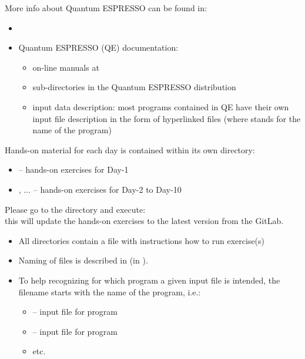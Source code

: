\documentclass[landscape]{foils}
\begin{document}
More info about Quantum ESPRESSO can be found in:
\begin{itemize}
\item {}
\item Quantum ESPRESSO (QE) documentation:
  \begin{itemize}
  \item on-line manuals at
    \\
    
  \item {} sub-directories in the {\sc Quantum ESPRESSO}
    distribution\\
    
  \item input data description: most programs contained in QE have
    their own input file description in the form of hyperlinked
     files (where \file{***} stands for the name
    of the program)
  \end{itemize}
\end{itemize}


Hands-on material for each day is contained within its own directory:
\vspace{-0.5em}
\begin{itemize}
\item {} -- hands-on exercises for Day-1
  \vspace{-0.5em}
\item {},  $\ldots$  -- hands-on
  exercises for Day-2 to Day-10
\end{itemize}

Please go to the  directory and execute: ~\\
this will update the hands-on exercises to the latest version from the
GitLab.
\begin{itemize}
\item All directories contain a  file with instructions
  how to run exercise(s)
\vspace{-0.5em}
\item Naming of files is described in  (in
  ).
\vspace{-0.5em}
\item To help recognizing for which program a given input file is
  intended, the filename starts with the name of the program, i.e.:
  \vspace{-0.5em}
\begin{itemize}
\item {} -- input file for  program
\item {} -- input file for  program
\item etc.
\end{itemize}
\end{itemize}
\end{document}
